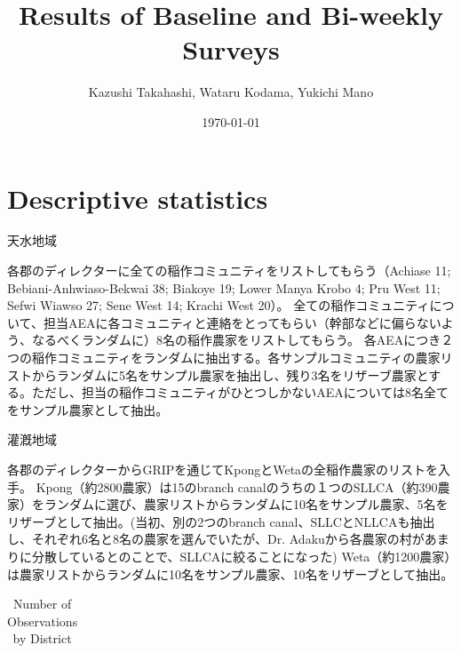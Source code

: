 \documentclass[paper=a4, fontsize=10.5pt]{jlreq}
\title{Results of Baseline and Bi-weekly Surveys }
\author{Kazushi Takahashi, Wataru Kodama, Yukichi Mano}
\date{
	\today
}
\begin{document}
	\maketitle
\section{Descriptive statistics}  
天水地域

各郡のディレクターに全ての稲作コミュニティをリストしてもらう（Achiase 11; Bebiani-Anhwiaso-Bekwai 38; Biakoye 19; Lower Manya Krobo 4; Pru West 11; Sefwi Wiawso 27; Sene West 14; Krachi West 20）。
全ての稲作コミュニティについて、担当AEAに各コミュニティと連絡をとってもらい（幹部などに偏らないよう、なるべくランダムに）8名の稲作農家をリストしてもらう。
各AEAにつき２つの稲作コミュニティをランダムに抽出する。各サンプルコミュニティの農家リストからランダムに5名をサンプル農家を抽出し、残り3名をリザーブ農家とする。ただし、担当の稲作コミュニティがひとつしかないAEAについては8名全てをサンプル農家として抽出。


灌漑地域

各郡のディレクターからGRIPを通じてKpongとWetaの全稲作農家のリストを入手。
Kpong（約2800農家）は15のbranch canalのうちの１つのSLLCA（約390農家）をランダムに選び、農家リストからランダムに10名をサンプル農家、5名をリザーブとして抽出。(当初、別の2つのbranch canal、SLLCとNLLCAも抽出し、それぞれ6名と8名の農家を選んでいたが、Dr. Adakuから各農家の村があまりに分散しているとのことで、SLLCAに絞ることになった)
Weta（約1200農家）は農家リストからランダムに10名をサンプル農家、10名をリザーブとして抽出。

\begin{table}[hbtp]
	\centering
	\begin{threeparttable}
		\caption{Number of Observations by District}
		
		\begin{tabular}{llccc}
			\hline
			
		\end{tabular}
		
	\end{threeparttable}
\end{table}

	\begin{table}[hbtp]
		\centering
		\scriptsize
		\begin{threeparttable}
			\caption{Demographic Characteristics}
			
			
			
		\end{threeparttable}
	\end{table}
\end{document}
